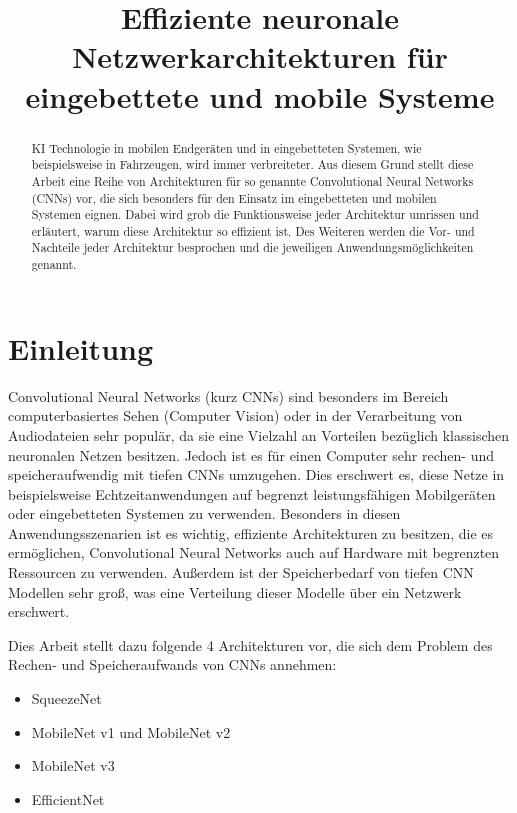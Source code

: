 \documentclass[conference]{IEEEtran}
\begin{document}
\title{Effiziente neuronale Netzwerkarchitekturen für eingebettete und mobile Systeme}

\author{
}

\maketitle

\begin{abstract}
KI Technologie in mobilen Endgeräten und in eingebetteten Systemen, wie beispielsweise in Fahrzeugen, wird immer verbreiteter. Aus diesem Grund stellt diese Arbeit eine Reihe von Architekturen für so genannte Convolutional Neural Networks (CNNs) vor, die sich besonders für den Einsatz im eingebetteten und mobilen Systemen eignen. Dabei wird grob die Funktionsweise jeder Architektur umrissen und erläutert, warum diese Architektur so effizient ist. Des Weiteren werden die Vor- und Nachteile jeder Architektur besprochen und die jeweiligen Anwendungsmöglichkeiten genannt.
\end{abstract}


\section{Einleitung}
Convolutional Neural Networks (kurz CNNs) sind besonders im Bereich computerbasiertes Sehen (Computer Vision) oder in der Verarbeitung von Audiodateien sehr populär, da sie eine Vielzahl an Vorteilen bezüglich klassischen neuronalen Netzen besitzen. Jedoch ist es für einen Computer sehr rechen- und speicheraufwendig mit tiefen CNNs umzugehen. Dies erschwert es, diese Netze in beispielsweise Echtzeitanwendungen auf begrenzt leistungsfähigen Mobilgeräten oder eingebetteten Systemen zu verwenden. Besonders in diesen Anwendungsszenarien ist es wichtig, effiziente Architekturen zu besitzen, die es ermöglichen, Convolutional Neural Networks auch auf Hardware mit begrenzten Ressourcen zu verwenden. Außerdem ist der Speicherbedarf von tiefen CNN Modellen sehr groß, was eine Verteilung dieser Modelle über ein Netzwerk erschwert.
 
Dies Arbeit stellt dazu folgende 4 Architekturen vor, die sich dem Problem des Rechen- und Speicheraufwands von CNNs annehmen:
\begin{itemize}
\item SqueezeNet
\item MobileNet v1 und MobileNet v2
\item MobileNet v3
\item EfficientNet
\end{itemize}
\end{document}
